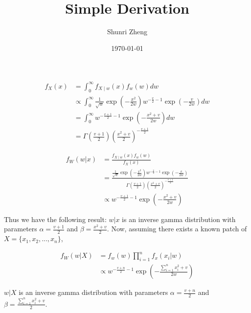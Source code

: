 \documentclass[12pt]{article}
\title{Simple Derivation}
\author{Shunri Zheng}
\date{\today}
\begin{document}
\maketitle



\begin{equation}
    \begin{split}
        f_X(x) & =\int_0^{\infty} f_{X \mid w}(x) f_w(w) d w \\ 
        & \propto \int_0^{\infty} \frac{1}{\sqrt{w}} \exp \left(-\frac{x^2}{2 w}\right) w^{-\frac{v}{2}-1} \exp \left(-\frac{v}{2 w}\right) d w \\ 
        & =\int_0^{\infty} w^{-\frac{v+1}{2}-1} \exp \left(-\frac{x^2+v}{2 w}\right) d w \\ 
        & =\Gamma\left(\frac{v+1}{2}\right)\left(\frac{x^2+v}{2}\right)^{-\frac{v+1}{2}}
    \end{split}
\end{equation}


\begin{equation}
    \begin{split}
        f_W(w|x) & =\frac{f_{X \mid w}(x) f_w(w)}{f_X(x)} \\  
        & =\frac{\frac{1}{\sqrt{w}} \exp \left(-\frac{x^2}{2 w}\right) w^{-\frac{v}{2}-1} \exp \left(-\frac{v}{2 w}\right)}{\Gamma\left(\frac{v+1}{2}\right)\left(\frac{x^2+v}{2}\right)^{-\frac{v+1}{2}}} \\
        & \propto w^{-\frac{v+1}{2}-1} \exp \left(-\frac{x^2+v}{2 w}\right) 
    \end{split}
\end{equation}

Thus we have the following result:
$w|x$ is an inverse gamma distribution with parameters $\alpha = \frac{v+1}{2}$ and $\beta = \frac{x^2+v}{2}$.
Now, assuming there exists a known patch of $X = \{x_1,x_2,...,x_n\}$,


\begin{equation}
    \begin{split}
        f_W(w|X) & =f_w(w)\prod_{i=1}^{n} f_x(x_i|w) \\
        &\propto w^{-\frac{v+n}{2}-1} \exp \left(-\frac{\sum\limits_{i=1}^n x_i^2+v}{2 w}\right) 
    \end{split}
\end{equation}

$w|X$ is an inverse gamma distribution with parameters $\alpha = \frac{v+n}{2}$ and $\beta = \frac{\sum\limits_{i=1}^n x_i^2+v}{2}$.
\end{document}
